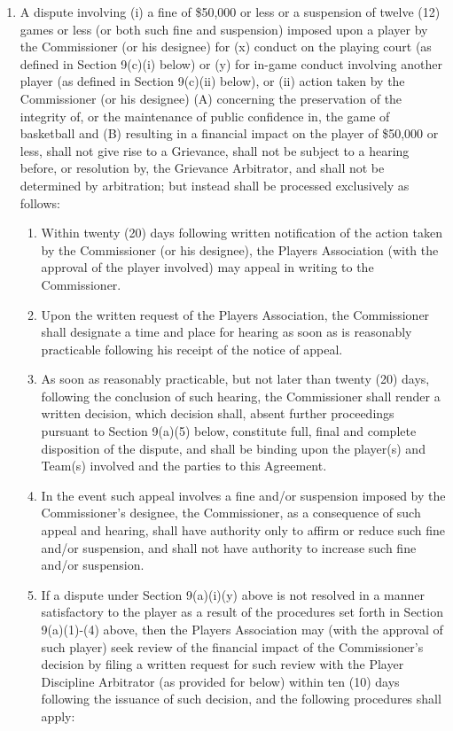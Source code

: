 \documentclass[
]{book}
\providecommand{\tightlist}{%
  \setlength{\itemsep}{0pt}\setlength{\parskip}{0pt}}
\begin{document}
\begin{enumerate}
\def\labelenumi{(\alph{enumi})}
\item
  A dispute involving (i) a fine of \$50,000 or less or a suspension of twelve (12) games or less (or both such fine and suspension) imposed upon a player by the Commissioner (or his designee) for (x) conduct on the playing court (as defined in Section 9(c)(i) below) or (y) for in-game conduct involving another player (as defined in Section 9(c)(ii) below), or (ii) action taken by the Commissioner (or his designee) (A) concerning the preservation of the integrity of, or the maintenance of public confidence in, the game of basketball and (B) resulting in a financial impact on the player of \$50,000 or less, shall not give rise to a Grievance, shall not be subject to a hearing before, or resolution by, the Grievance Arbitrator, and shall not be determined by arbitration; but instead shall be processed exclusively as follows:

  \begin{enumerate}
  \def\labelenumii{(\arabic{enumii})}
  \tightlist
  \item
    Within twenty (20) days following written notification of the action taken by the Commissioner (or his designee), the Players Association (with the approval of the player involved) may appeal in writing to the Commissioner.
  \item
    Upon the written request of the Players Association, the Commissioner shall designate a time and place for hearing as soon as is reasonably practicable following his receipt of the notice of appeal.
  \item
    As soon as reasonably practicable, but not later than twenty (20) days, following the conclusion of such hearing, the Commissioner shall render a written decision, which decision shall, absent further proceedings pursuant to Section 9(a)(5) below, constitute full, final and complete disposition of the dispute, and shall be binding upon the player(s) and Team(s) involved and the parties to this Agreement.
  \item
    In the event such appeal involves a fine and/or suspension imposed by the Commissioner's designee, the Commissioner, as a consequence of such appeal and hearing, shall have authority only to affirm or reduce such fine and/or suspension, and shall not have authority to increase such fine and/or suspension.
  \item
    If a dispute under Section 9(a)(i)(y) above is not resolved in a manner satisfactory to the player as a result of the procedures set forth in Section 9(a)(1)-(4) above, then the Players Association may (with the approval of such player) seek review of the financial impact of the Commissioner's decision by filing a written request for such review with the Player Discipline Arbitrator (as provided for below) within ten (10) days following the issuance of such decision, and the following procedures shall apply:


\end{enumerate}
\end{enumerate}
\end{document}
